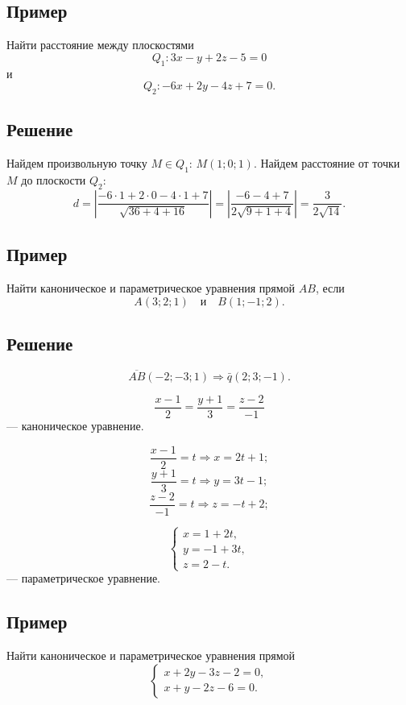 \documentclass[12pt,a4paper]{article}
\newcommand{\vq}{\bar q}
\begin{document}
\subsection*{\textbf{Пример}}

Найти расстояние между плоскостями
$$
Q_1:3x-y+2z-5=0
$$
и
$$
Q_2:-6x+2y-4z+7=0.
$$

\subsection*{\textbf{Решение}}

Найдем произвольную точку $M\in Q_1$: $M(1;0;1)$. Найдем расстояние от
точки $M$ до плоскости $Q_2$:
$$
d=\left|\frac{-6\cdot1+2\cdot0-4\cdot1+7}{\sqrt{36+4+16}}\right|
=
\left|\frac{-6-4+7}{2\sqrt{9+1+4}}\right|
=
\frac3{2\sqrt{14}}.
$$

\subsection*{\textbf{Пример}}

Найти каноническое и параметрическое уравнения прямой $AB$, если
$$
A(3;2;1)\quad \text{и}\quad B(1;-1;2).
$$

\subsection*{\textbf{Решение}}

$$
\overline{AB}(-2;-3;1)\Rightarrow \vq(2;3;-1).
$$

$$
\frac{x-1}{2}=\frac{y+1}{3}=\frac{z-2}{-1}
$$
--- каноническое уравнение.

$$
\frac{x-1}{2}=t\Rightarrow x=2t+1;
$$
$$
\frac{y+1}{3}=t\Rightarrow y=3t-1;
$$
$$
\frac{z-2}{-1}=t\Rightarrow z=-t+2;
$$

$$
\begin{cases}
x=1+2t,\\
y=-1+3t,\\
z=2-t.
\end{cases}
$$
--- параметрическое уравнение.

\subsection*{\textbf{Пример}}

Найти каноническое и параметрическое уравнения прямой
$$
\begin{cases}
x+2y-3z-2=0,\\
x+y-2z-6=0.
\end{cases}
$$
\end{document}
